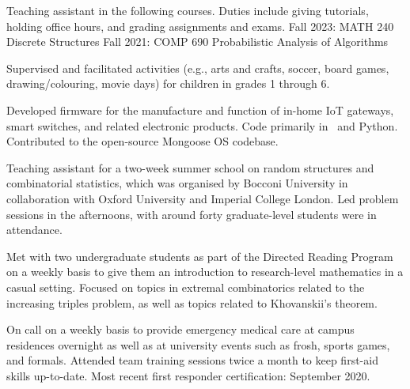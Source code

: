 
\smallskip
Teaching assistant in the following courses. Duties include giving tutorials, holding office hours, and
grading assignments and exams.
\begingroup\parindent=10pt
\smallskip
\thing Fall 2023: MATH 240 Discrete Structures
\smallskip
\thing Fall 2021: COMP 690 Probabilistic Analysis of Algorithms
\endgroup
\medbreak

\smallskip
Supervised and facilitated activities (e.g., arts and crafts, soccer, board games, drawing/colouring, movie
days) for children in grades 1 through 6.
\medbreak

\smallskip
Developed firmware for the manufacture and function of in-home IoT gateways, smart switches,
and related electronic products. Code primarily in \CEE\ and Python. Contributed to the open-source
Mongoose OS codebase.
\medbreak

\smallskip
Teaching assistant for a two-week summer school on random structures and combinatorial statistics,
which was
organised by Bocconi University in collaboration with Oxford University
and Imperial College London. Led problem sessions in the afternoons, with
around forty graduate-level students were in attendance.
\medbreak

\smallskip
Met with two undergraduate students as part of the Directed Reading Program
on a weekly basis to give them an introduction to research-level
mathematics in a casual setting. Focused on topics in extremal combinatorics related to the increasing
triples problem, as well as topics related to Khovanskii's theorem.
\medbreak

\smallskip
On call on a weekly basis to provide emergency medical care at campus residences overnight as well as at
university events such as frosh, sports games, and formals. Attended team training sessions twice a month to keep
first-aid skills up-to-date. Most recent first responder certification: September 2020.
\medbreak

